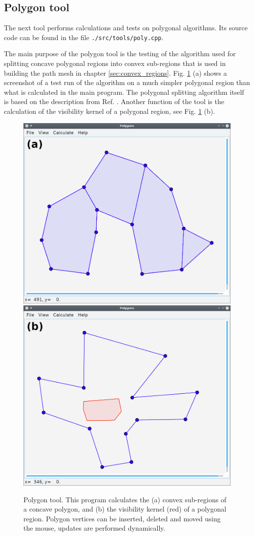 \subsection{Polygon tool}
The next tool performs calculations and tests on polygonal algorithms. 
Its source code can be found in the file \lstinline|./src/tools/poly.cpp|.

The main purpose of the polygon tool is the testing of the algorithm used for splitting concave 
polygonal regions into convex sub-regions that is used in building the path mesh in chapter \ref{sec:convex_regions}. 
Fig. \ref{fig:polygui} (a) shows a screenshot of a test run of the algorithm on a much simpler
polygonal region than what is calculated in the main program. The polygonal splitting algorithm 
itself is based on the description from Ref. \cite{Hegazy2014}.
Another function of the tool is the calculation of the visibility kernel \cite{TODO} of a 
polygonal region, see Fig. \ref{fig:polygui} (b).


\begin{figure}[h]
	\centering
	\includegraphics[width = 0.49 \textwidth]{figures/polygui_convex}
	\hspace{0.05cm}
	\includegraphics[width = 0.49 \textwidth]{figures/polygui_kernel}
	\caption[Polygon tool.]{Polygon tool.
		This program calculates the
		(a) convex sub-regions of a concave polygon, and
		(b) the visibility kernel (red) of a polygonal region.
		Polygon vertices can be inserted, deleted and moved using the mouse, updates
		are performed dynamically.
		\label{fig:polygui}}
\end{figure}



